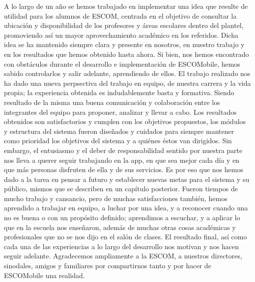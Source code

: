 \noindent
A lo largo de un año se hemos trabajado en implementar una idea que resulte de utilidad para los alumnos de ESCOM, centrada en el objetivo de consultar la ubicación y disponibilidad de los profesores y áreas escolares dentro del plantel, promoviendo así un mayor aprovechamiento académico en los referidos. Dicha idea se ha mantenido siempre clara y presente en nosotros, en nuestro trabajo y en los resultados que hemos obtenido hasta ahora. Si bien, nos hemos encontrado con obstáculos durante el desarrollo e implementación de ESCOMobile, hemos sabido controlarlos y salir adelante, aprendiendo de ellos. El trabajo realizado nos ha dado una nueva perpsectiva del trabajo en equipo, de nuestra carrera y la vida propia; la experiencia obtenida es indudablemente basta y formativa. Siendo resultado de la misma una buena comunicación y colaboración entre los integrantes del equipo para proponer, analizar y llevar a cabo. 
\newline
\newline
Los resultados obtenidos son satisfactorios y cumplen con los objetivos propuestos, los módulos y estructura del sistema fueron diseñados y cuidados para siempre mantener como prioridad los objetivos del sistema y a quiénes éstos van dirigidos. Sin embargo, el entusiasmo y el deber de responsabilidad sentido por nuestra parte nos lleva a querer seguir trabajando en la app, en que sea mejor cada día y en que más personas disfruten de ella y de sus servicios. Es por eso que nos hemos dado a la tarea en pensar a futuro y establecer nuevas metas para el sistema y su público, mismos que se describen en un capítulo posterior. 
\newline
\newline
Fueron tiempos de mucho trabajo y cansancio, pero de muchas satisfacciones también, hemos aprendido a trabajar en equipo, a luchar por una idea, y a reconocer cuando una no es buena o con un propósito definido; aprendimos a escuchar, y a aplicar lo que en la escuela nos enseñaron, además de muchas otras cosas académicas y profesionales que no se nos dijo en el salón de clases. El resultado final, así como cada una de las experiencias a lo largo del desarrollo nos motivan y nos hacen seguir adelante. 
\newline
Agradecemos ampliamente a la ESCOM, a nuestros directores, sinodales, amigos y familiares por compartirnos tanto y por hacer de ESCOMobile una realidad. 
